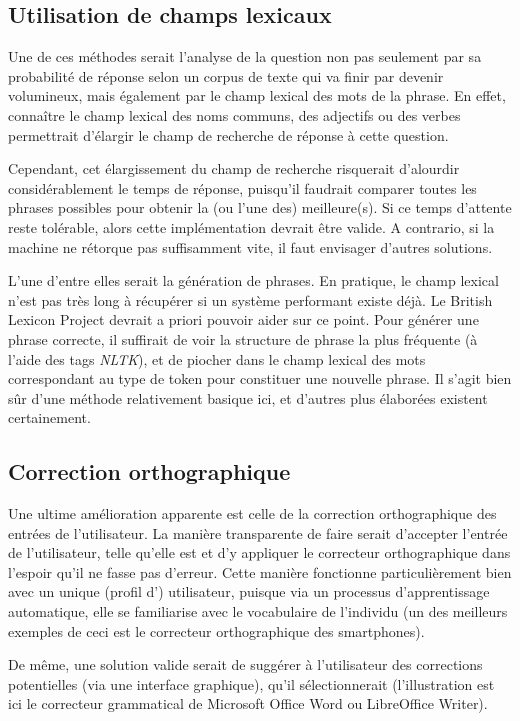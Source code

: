 \subsection{Utilisation de champs lexicaux}%
	Une de ces méthodes serait l'analyse de la question non pas seulement par sa probabilité de réponse selon un corpus de texte qui va finir par devenir volumineux, mais également par le champ lexical des mots de la phrase. En effet, connaître le champ lexical des noms communs, des adjectifs ou des verbes permettrait d'élargir le champ de recherche de réponse à cette question.

	Cependant, cet élargissement du champ de recherche risquerait d'alourdir considérablement le temps de réponse, puisqu'il faudrait comparer toutes les phrases possibles pour obtenir la (ou l'une des) meilleure(s). Si ce temps d'attente reste tolérable, alors cette implémentation devrait être valide. A contrario, si la machine ne rétorque pas suffisamment vite, il faut envisager d'autres solutions.

	L'une d'entre elles serait la génération de phrases. En pratique, le champ lexical n'est pas très long à récupérer si un système performant existe déjà. Le British Lexicon Project devrait a priori pouvoir aider sur ce point. Pour générer une phrase correcte, il suffirait de voir la structure de phrase la plus fréquente (à l'aide des tags \textit{NLTK}), et de piocher dans le champ lexical des mots correspondant au type de token pour constituer une nouvelle phrase. Il s'agit bien sûr d'une méthode relativement basique ici, et d'autres plus élaborées existent certainement.

\subsection{Correction orthographique}
Une ultime amélioration apparente est celle de la correction orthographique des entrées de l'utilisateur. La manière transparente de faire serait d'accepter l'entrée de l'utilisateur, telle qu'elle est et d'y appliquer le correcteur orthographique dans l'espoir qu'il ne fasse pas d'erreur. Cette manière fonctionne particulièrement bien avec un unique (profil d') utilisateur, puisque via un processus d'apprentissage automatique, elle se familiarise avec le vocabulaire de l'individu (un des meilleurs exemples de ceci est le correcteur orthographique des smartphones).

De même, une solution valide serait de suggérer à l'utilisateur des corrections potentielles (via une interface graphique), qu'il sélectionnerait (l'illustration est ici le correcteur grammatical de Microsoft Office Word ou LibreOffice Writer).

